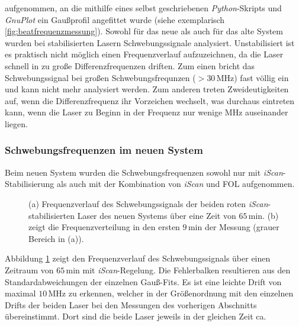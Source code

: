 aufgenommen, an die  mithilfe eines selbst geschriebenen \textit{Python}-Skripts
und \textit{GnuPlot} ein Gaußprofil angefittet wurde (siehe exemplarisch
\ref{fig:beatfrequenzmessung}).
Sowohl für das neue als auch für das alte System wurden bei stabilisierten
Lasern Schwebungssignale analysiert. Unstabilisiert ist es praktisch nicht
möglich einen Frequenzverlauf aufzuzeichnen, da die Laser schnell in zu
große Differenzfrequenzen driften. Zum einen bricht das Schwebungssignal
bei großen Schwebungsfrequnzen ($>30\,$MHz) fast völlig ein und kann nicht mehr
analysiert werden. Zum anderen treten Zweideutigkeiten auf, wenn die
Differenzfrequenz ihr Vorzeichen wechselt, was durchaus eintreten kann, wenn die
Laser zu Beginn in der Frequenz nur wenige MHz auseinander liegen.

\subsubsection{Schwebungsfrequenzen im neuen
System}\label{subsubsec:beatfrequenzmessung_neues_system}
Beim neuen System wurden die Schwebungsfrequenzen sowohl nur mit
\textit{iScan}-Stabilisierung als auch mit der Kombination von \textit{iScan}
und FOL aufgenommen.
\begin{figure}[hp]
 	\centering
 	\footnotesize
 	\fbox{\parbox{\dimexpr \linewidth - 2\fboxrule - 2\fboxsep}{
 	\subfloat[]{
		\label{subfig:beatfrequenzen_neu_iScan_drift}
		
		}\\
 	\subfloat[]{
		\label{subfig:beatfrequenzen_neu_iScan_histogramm}
		
		}
	}}
	\caption[Schwebungsfrequenzen - neues System mit \textit{iScan}]{(a) Frequenzverlauf
	des Schwebungssignals der beiden roten \textit{iScan}-stabilisierten Laser des neuen Systems über eine Zeit von
	$65\,$min. (b) zeigt die Frequenzverteilung in den ersten $9\,$min der
	Messung (grauer Bereich in (a)).}
	\label{fig:beatfrequenzen_neu_iScan}
\end{figure}
Abbildung
\ref{fig:beatfrequenzen_neu_iScan} zeigt den Frequenzverlauf des Schwebungssignals über einen Zeitraum von $65\,$min mit
\textit{iScan}-Regelung. Die Fehlerbalken resultieren aus den
Standardabweichungen der einzelnen Gauß-Fits. Es ist eine leichte Drift von
maximal $10\,$MHz zu erkennen, welcher in der Größenordnung mit den
einzelnen Drifts der beiden Laser bei den Messungen des vorherigen Abschnitts
übereinstimmt. Dort sind die beide Laser jeweils in der gleichen Zeit ca.
